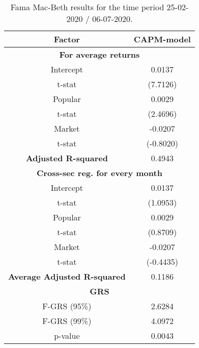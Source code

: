 \begin{table}[h!]
	\centering
	\captionsetup{skip=0.5\baselineskip}
	\caption{Fama Mac-Beth results for the time period 25-02-2020 / 06-07-2020.}
	\begin{tabular}{|c|c|}
		\hline
		\textbf{Factor} & \textbf{CAPM-model} \\ \hline
		\multicolumn{2}{|c|}{\textbf{For average returns}} \\ \hline
		Intercept & 0.0137 \\ 
		t-stat & (7.7126) \\ \hline
		Popular & 0.0029 \\ 
		t-stat & (2.4696)\\ \hline
		Market & -0.0207 \\
		t-stat & (-0.8020)\\ \hline
		\textbf{Adjusted R-squared} & 0.4943 \\ \hline
		\multicolumn{2}{|c|}{\textbf{Cross-sec reg. for every month}} \\ \hline
		Intercept & 0.0137 \\ 
		t-stat & (1.0953) \\ \hline
		Popular & 0.0029 \\ 
		t-stat & (0.8709)\\ \hline
		Market & -0.0207 \\
		t-stat & (-0.4435)\\ \hline
		\textbf{Average Adjusted R-squared} & 0.1186 \\ \hline
		\multicolumn{2}{|c|}{\textbf{GRS}} \\ \hline
		F-GRS (95\%) & 2.6284 \\ \hline
		F-GRS (99\%) & 4.0972 \\ \hline
		p-value & 0.0043 \\ \hline
	\end{tabular}
\end{table}

